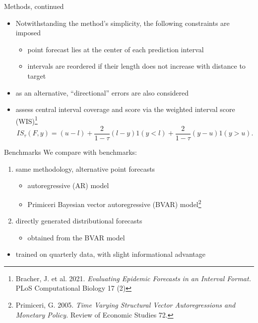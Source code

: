 \documentclass[en]{sdqbeamer}
\begin{document}
\begin{frame}{Methods, continued}
\begin{itemize}
\item Notwithstanding the method's simplicity, the following constraints are imposed
\begin{itemize}
    \item point forecast lies at the center of each prediction interval  
    \item intervals are reordered if their length does not increase with distance to target 
\end{itemize}
\item as an alternative, ``directional'' errors are also considered \bigskip
\item assess central interval coverage and score via the weighted interval score (WIS)\footnote{Bracher, J. et al. 2021. \textit{Evaluating
Epidemic Forecasts in an Interval Format.} PLoS Computational Biology 17 (2)}
\begin{equation*} \label{eq:interval_score}
IS_{\tau}(F, y) = (u-l) + \frac{2}{1-\tau}(l - y)1(y < l) + \frac{2}{1-\tau}(y - u)1(y > u).
\end{equation*}
\end{itemize}
\end{frame}

\begin{frame}{Benchmarks}
    We compare with benchmarks:
\begin{enumerate}
    \item same methodology, alternative point forecasts
    \begin{itemize}
        \item autoregressive (AR) model
        \item Primiceri Bayesian vector autoregressive (BVAR) model\footnote{Primiceri, G. 2005. \textit{Time Varying Structural Vector Autoregressions and Monetary Policy.} Review of Economic Studies 72.}
    \end{itemize}
    \item directly generated distributional forecasts
    \begin{itemize}
        \item obtained from the BVAR model
    \end{itemize}
\end{enumerate}
\begin{itemize}
    \item trained on quarterly data, with slight informational advantage
\end{itemize}

\end{frame}
\end{document}
